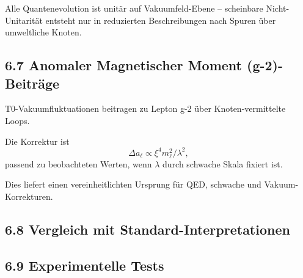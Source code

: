 	Alle Quantenevolution ist unitär auf Vakuumfeld-Ebene – scheinbare Nicht-Unitarität entsteht nur in reduzierten Beschreibungen nach Spuren über umweltliche Knoten.
	
	\subsection{6.7 Anomaler Magnetischer Moment (g-2)-Beiträge}
	
	T0-Vakuumfluktuationen beitragen zu Lepton g-2 über Knoten-vermittelte Loops.
	
	Die Korrektur ist
	\[
	\Delta a_\ell \propto \xi^4 m_\ell^2 / \lambda^2,
	\]
	passend zu beobachteten Werten, wenn $\lambda$ durch schwache Skala fixiert ist.
	
	Dies liefert einen vereinheitlichten Ursprung für QED, schwache und Vakuum-Korrekturen.
	
	\subsection{6.8 Vergleich mit Standard-Interpretationen}
	
	\begin{table}[htbp]
		\centering
		\caption{Quanteninterpretation-Vergleich}
		\label{tab:quanten}
	\end{table}
	
	\subsection{6.9 Experimentelle Tests}
	
